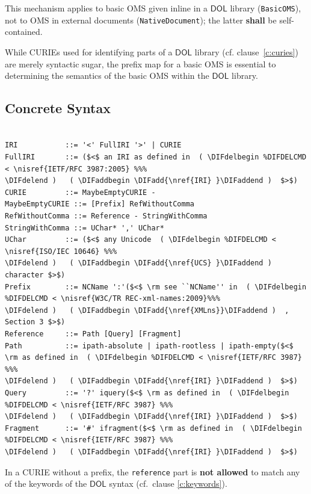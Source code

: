 \documentclass[10pt,fleqn,final]{scrreprt}
\makeatletter
\newcommand*{\cf}{cf.\@\xspace}
\newcommand*{\syntax}[1]{\texttt{#1}}
\newcommand*{\notallowed}{\textbf{not allowed}\xspace}
\newcommand*{\shall}{\textbf{shall}\xspace}
\newcommand*{\DOL}{\ensuremath{\mathsf{DOL}}\xspace}
\newcommand{\clauserefname}{clause}
\newcommand{\noterefname}{note}
\newcommand{\cref}[1]{\clauserefname~\ref{#1}}
\newcommand{\nref}[1]{\noterefname~\ref{#1}}
\newcommand{\ssclause}[1]{\subsection{#1}}
\renewcommand{\nref}[1]{\ref{nref-#1}} %
\newenvironment{definitions}[0]{\medskip }{}
\providecommand{\DIFadd}[1]{{\protect\color{blue}\uwave{#1}}} %
\providecommand{\DIFaddbegin}{} %
\providecommand{\DIFaddend}{} %
\providecommand{\DIFdelbegin}{} %
\providecommand{\DIFdelend}{} %
\makeatother
\begin{document}
\begin{definitions}
This mechanism applies to basic OMS given inline in a \DOL library (\syntax{BasicOMS}), not to OMS in external documents (\syntax{NativeDocument}); the latter \shall be self-contained.

While CURIEs used for identifying parts of a \DOL library (\cf \cref{c:curies}) are merely syntactic 
sugar, the prefix map for a basic OMS is essential to determining the semantics of the basic OMS 
within the \DOL library. 




\ssclause{Concrete Syntax}\DIFaddbegin \label{c:curie-syntax}
\DIFaddend 

\vspace{-1.4em}
\begin{lstlisting}[language=ebnf,escapeinside={()}]

IRI           ::= '<' FullIRI '>' | CURIE
FullIRI       ::= ($<$ an IRI as defined in  ( \DIFdelbegin %DIFDELCMD < \nisref{IETF/RFC 3987:2005} %%%
\DIFdelend )   ( \DIFaddbegin \DIFadd{\nref{IRI} }\DIFaddend )  $>$) 
CURIE         ::= MaybeEmptyCURIE -
MaybeEmptyCURIE ::= [Prefix] RefWithoutComma
RefWithoutComma ::= Reference - StringWithComma
StringWithComma ::= UChar* ',' UChar*
UChar         ::= ($<$ any Unicode  ( \DIFdelbegin %DIFDELCMD < \nisref{ISO/IEC 10646} %%%
\DIFdelend )   ( \DIFaddbegin \DIFadd{\nref{UCS} }\DIFaddend )  character $>$) 
Prefix        ::= NCName ':'($<$ \rm see ``NCName'' in  ( \DIFdelbegin %DIFDELCMD < \nisref{W3C/TR REC-xml-names:2009}%%%
\DIFdelend )   ( \DIFaddbegin \DIFadd{\nref{XMLns}}\DIFaddend )  , Section 3 $>$)
Reference     ::= Path [Query] [Fragment]
Path          ::= ipath-absolute | ipath-rootless | ipath-empty($<$ \rm as defined in  ( \DIFdelbegin %DIFDELCMD < \nisref{IETF/RFC 3987} %%%
\DIFdelend )   ( \DIFaddbegin \DIFadd{\nref{IRI} }\DIFaddend )  $>$)
Query         ::= '?' iquery($<$ \rm as defined in  ( \DIFdelbegin %DIFDELCMD < \nisref{IETF/RFC 3987} %%%
\DIFdelend )   ( \DIFaddbegin \DIFadd{\nref{IRI} }\DIFaddend )  $>$)
Fragment      ::= '#' ifragment($<$ \rm as defined in  ( \DIFdelbegin %DIFDELCMD < \nisref{IETF/RFC 3987} %%%
\DIFdelend )   ( \DIFaddbegin \DIFadd{\nref{IRI} }\DIFaddend )  $>$)
\end{lstlisting}


In a CURIE without a prefix, the \syntax{reference} part is \notallowed to match any of the keywords of the \DOL syntax (cf.\ clause \ref{c:keywords}).

\medspace






\end{definitions}
\end{document}
